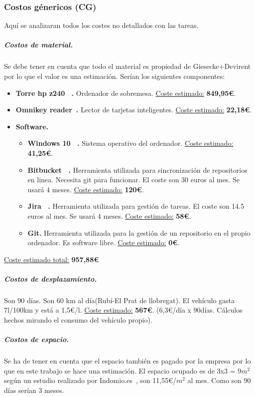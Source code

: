 \documentclass[12pt]{article}
\begin{document}
    \subsubsection{Costos génericos (CG)}
    Aquí se analizaran todos los costes no detallados con las tareas.
    \subparagraph{Costos de material.} Se debe tener en cuenta que todo el material es propiedad de Giesecke+Devirent por lo que el valor es una estimación. Serían los siguientes componentes:
    \begin{itemize}
        \item \textbf{Torre hp z240 ~\cite{8}.} Ordenador de sobremesa. \underline{Coste estimado:} \textbf{849,95\euro}.
        \item \textbf{Omnikey reader~\cite{9}.} Lector de tarjetas inteligentes. \underline{Coste estimado:} \textbf{22,18\euro}.
        \item \textbf{Software.} 
            \begin{itemize}
                \item \textbf{Windows 10 ~\cite{13}.} Sistema operativo del ordenador. \underline{Coste estimado:} \textbf{41,25\euro}.
                \item \textbf{Bitbucket ~\cite{14}.} Herramienta utilizada para sincronización de repositorios en linea. Necesita git para funcionar. El coste son 30 euros al mes. Se usará 4 meses. \underline{Coste estimado:} \textbf{120\euro}.
                \item \textbf{Jira ~\cite{15}.} Herramienta utilizada para gestión de tareas. El coste son 14.5
                euros al mes. Se usará 4 meses. \underline{Coste estimado:} \textbf{58\euro}.
                \item \textbf{Git.} Herramienta utilizada para la gestión de un repositorio en el propio ordenador. Es software libre. \underline{Coste estimado:} \textbf{0\euro}.
            \end{itemize}
    \end{itemize}
    \underline{Coste estimado total:} \textbf{957,88\euro}
    \subparagraph{Costos de desplazamiento.} Son 90 días. Son 60 km al día(Rubí-El Prat de llobregat). El vehículo gasta 7l/100km y está a 1,5\euro/l. \underline{Coste estimado:} \textbf{567\euro}. (6,3\euro/día x 90días. Cálculos hechos mirando el consumo del vehículo propio).
    \subparagraph{Costos de espacio.} Se ha de tener en cuenta que el espacio también es pagado por la empresa por lo que en este trabajo se hace una estimación. El espacio ocupado es de 3x3 = 9$m^{2}$  según un estudio realizado por Indomio.es~\cite{10}, son 11,55\euro/$m^{2}$ al mes. Como son 90 días serían 3 meses.
\end{document}
